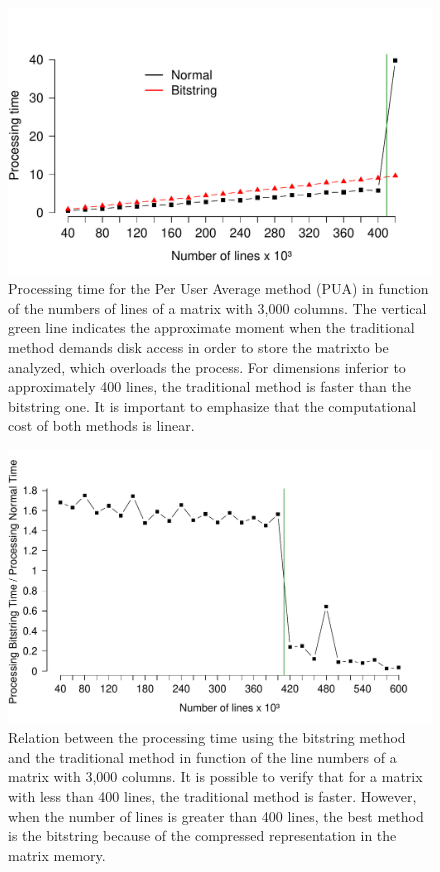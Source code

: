 \documentclass[10pt]{article}
\begin{document}
\begin{figure}[h]
  \centering
  \includegraphics[scale=0.6,clip]{fig40}
  \caption{Processing time for the Per User Average method (PUA) in function of the  numbers of lines of a matrix 
  with 3,000 columns.  The vertical green line indicates the approximate moment when the traditional method  
  demands disk access in order to store the matrixto be analyzed, which  overloads the process. For dimensions 
  inferior to approximately 400 lines, the traditional method is faster than the bitstring one. It is important 
  to emphasize that the computational cost of both methods is linear.}
  \label{fig40}
\end{figure}

\begin{figure}[h]
  \centering
  \includegraphics[scale=0.6,clip]{fig41}
  \caption{Relation between the processing time using the bitstring method and the traditional method in function 
  of the line numbers of a matrix with 3,000 columns. It is possible to verify that for a matrix with less than 400 
  lines, the traditional method is faster. However, when the number of lines is greater  than 400 lines, the best 
  method is the bitstring because of the compressed representation in the matrix memory.}
  \label{fig41}
\end{figure}
\end{document}
